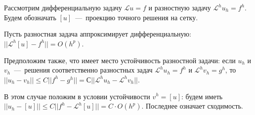 \documentclass[2pt, a4paper, fleqn]{extarticle}
\let\leq\leqslant
\begin{document}
Рассмотрим дифференциальную задачу $\mathcal{L}u = f$ и разностную задачу $\mathcal{L}^h u_h = f^h$. Будем обозначать $[u]$~---~проекцию точного решения на сетку.

Пусть разностная задача аппроксимирует дифференциальную: $||\mathcal{L}^h [u] - f^h|| = O(h^p)$.

Предположим также, что имеет место устойчивость разностной задачи: если $u_h$ и $v_h$~---~решения соответственно разностных задач $\mathcal{L}^h u_h = f^h$ и $\mathcal{L}^h v_h = g^h$, то $||u_h - v_h|| \leq C ||f^h - g^h|| = С||\mathcal{L}^h u_h - \mathcal{L}^h v_h||$.

В этом случае положим в условии устойчивости $v^h = [u]$: будем иметь $||u_h - [u]|| \leq C ||f^h - \mathcal{L}^h [u]|| = C\cdot O(h^p)$. Последнее означает сходимость.
\end{document}
